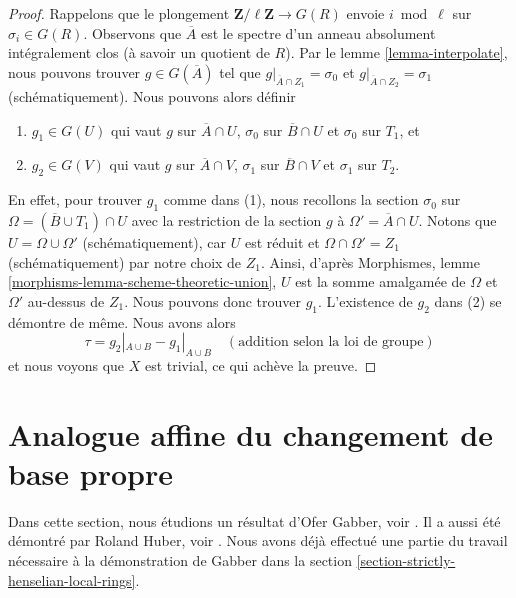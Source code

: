\begin{proof}
\medskip\noindent
Rappelons que le plongement $\mathbf{Z}/\ell \mathbf{Z} \to G(R)$
envoie $i \bmod \ell$ sur $\sigma_i \in G(R)$. Observons que $\overline{A}$
est le spectre d'un anneau absolument intégralement clos (à savoir
un quotient de $R$). Par le
lemme \ref{lemma-interpolate}, nous pouvons trouver $g \in G(\overline{A})$ tel que
$g|_{\overline{A} \cap Z_1} = \sigma_0$ et
$g|_{\overline{A} \cap Z_2} = \sigma_1$ (schématiquement).
Nous pouvons alors définir
\begin{enumerate}
\item $g_1 \in G(U)$ qui vaut $g$ sur $\overline{A} \cap U$,
$\sigma_0$ sur $\overline{B} \cap U$ et $\sigma_0$ sur $T_1$, et
\item $g_2 \in G(V)$ qui vaut $g$ sur $\overline{A} \cap V$,
$\sigma_1$ sur $\overline{B} \cap V$ et $\sigma_1$ sur $T_2$.
\end{enumerate}
En effet, pour trouver $g_1$ comme dans (1), nous recollons la section
$\sigma_0$ sur $\Omega = (\overline{B} \cup T_1) \cap U$
avec la restriction de la section $g$ à $\Omega' = \overline{A} \cap U$.
Notons que $U = \Omega \cup \Omega'$ (schématiquement),
car $U$ est réduit et $\Omega \cap \Omega' = Z_1$ (schématiquement)
par notre choix de $Z_1$. Ainsi, d'après
Morphismes, lemme \ref{morphisms-lemma-scheme-theoretic-union},
$U$ est la somme amalgamée de $\Omega$ et $\Omega'$
au-dessus de $Z_1$. Nous pouvons donc trouver $g_1$.
L'existence de $g_2$ dans (2) se démontre de même.
Nous avons alors
$$
\tau = g_2|_{A \cup B} - g_1|_{A \cup B} \quad(\text{addition selon la loi de groupe})
$$
et nous voyons que $X$ est trivial, ce qui achève la preuve.
\end{proof}




















\section{Analogue affine du changement de base propre}
\label{section-gabber-affine-proper}

\noindent
Dans cette section, nous étudions un résultat d'Ofer Gabber, voir
\cite{gabber-affine-proper}. Il a aussi été démontré par Roland Huber, voir
\cite{Huber-henselian}. Nous avons déjà effectué une partie du travail nécessaire
à la démonstration de Gabber dans la section \ref{section-strictly-henselian-local-rings}.

